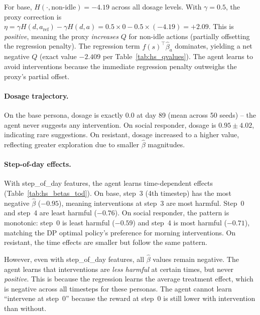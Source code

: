 \documentclass[11pt]{article}
\begin{document}
For base, $H(\cdot, \text{non-idle}) = -4.19$ across all dosage levels. With $\gamma = 0.5$, the proxy correction is $\eta = \gamma H(d, a_{\text{ref}}) - \gamma H(d, a) = 0.5 \times 0 - 0.5 \times (-4.19) = +2.09$. This is \emph{positive}, meaning the proxy \emph{increases} $Q$ for non-idle actions (partially offsetting the regression penalty). The regression term $f(s)^\top \hat{\beta}_a$ dominates, yielding a net negative $Q$ (exact value $-2.409$ per Table~\ref{tab:hs_qvalues}). The agent learns to avoid interventions because the immediate regression penalty outweighs the proxy's partial offset.

\paragraph{Dosage trajectory.}
On the base persona, dosage is exactly 0.0 at day 89 (mean across 50 seeds) -- the agent never suggests any intervention. On social responder, dosage is $0.95 \pm 4.02$, indicating rare suggestions. On resistant, dosage increased to a higher value, reflecting greater exploration due to smaller $\hat{\beta}$ magnitudes.

\paragraph{Step-of-day effects.}
With step\_of\_day features, the agent learns time-dependent effects (Table~\ref{tab:hs_betas_tod}). On base, step~3 (4th timestep) has the most negative $\hat{\beta}$ ($-0.95$), meaning interventions at step~3 are most harmful. Step~0 and step~4 are least harmful ($-0.76$). On social responder, the pattern is monotonic: step~0 is least harmful ($-0.59$) and step~4 is most harmful ($-0.71$), matching the DP optimal policy's preference for morning interventions. On resistant, the time effects are smaller but follow the same pattern.

However, even with step\_of\_day features, all $\hat{\beta}$ values remain negative. The agent learns that interventions are \emph{less harmful} at certain times, but never \emph{positive}. This is because the regression learns the average treatment effect, which is negative across all timesteps for these personas. The agent cannot learn ``intervene at step~0'' because the reward at step~0 is still lower with intervention than without.
\end{document}
